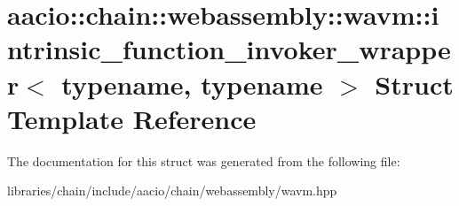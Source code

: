 \hypertarget{structaacio_1_1chain_1_1webassembly_1_1wavm_1_1intrinsic__function__invoker__wrapper}{}\section{aacio\+:\+:chain\+:\+:webassembly\+:\+:wavm\+:\+:intrinsic\+\_\+function\+\_\+invoker\+\_\+wrapper$<$ typename, typename $>$ Struct Template Reference}
\label{structaacio_1_1chain_1_1webassembly_1_1wavm_1_1intrinsic__function__invoker__wrapper}


The documentation for this struct was generated from the following file\+:\begin{DoxyCompactItemize}
\item 
libraries/chain/include/aacio/chain/webassembly/wavm.\+hpp\end{DoxyCompactItemize}

